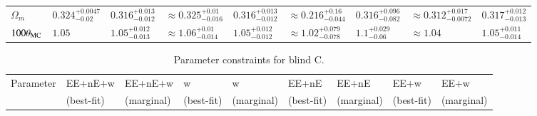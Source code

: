 \begin{appendix}
\begin{landscape}
\begin{table}
\begin{center}
\begin{tabular}{lllllllll}
$\Omega_m$& $0.324^{+0.0047}_{-0.02}$ & $0.316^{+0.013}_{-0.012}$& $\approx 0.325^{+0.01}_{-0.016}$ & $0.316^{+0.013}_{-0.012}$& $\approx 0.216^{+0.16}_{-0.044}$ & $0.316^{+0.096}_{-0.082}$& $\approx 0.312^{+0.017}_{-0.0072}$ & $0.317^{+0.012}_{-0.013}$\\
$100\theta_{\rm MC}$& $1.05$ & $1.05^{+0.012}_{-0.013}$& $\approx 1.06^{+0.01}_{-0.014}$ & $1.05^{+0.012}_{-0.012}$& $\approx 1.02^{+0.079}_{-0.078}$ & $1.1^{+0.029}_{-0.06}$& $\approx 1.04$ & $1.05^{+0.011}_{-0.014}$\\
    \bottomrule
\end{tabular}
\end{center}
\end{table}
\end{landscape}

\begin{landscape}
\begin{table}
\begin{center}
\caption{Parameter constraints for blind C. }
\begin{tabular}{lllllllll}
    \toprule
    Parameter    & EE+nE+w & EE+nE+w& w & w& EE+nE & EE+nE& EE+w & EE+w \\ 
             & (best-fit) & (marginal)& (best-fit) & (marginal)& (best-fit) & (marginal)& (best-fit) & (marginal) \\ 


\end{tabular}
\end{center}
\end{table}
\end{landscape}
\end{appendix}
